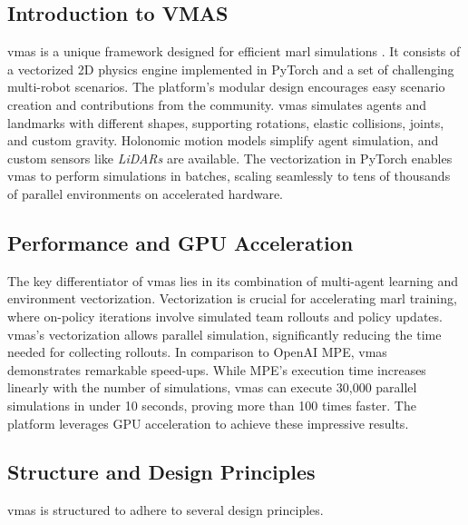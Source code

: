 \documentclass[12pt,a4paper,openright,twoside]{book}
\begin{document}
\subsection{Introduction to VMAS}

\ac{vmas} is a unique framework designed for efficient \ac{marl} simulations \cite{bettini2022vmas}. It consists of a vectorized 2D physics engine implemented in PyTorch and a set of challenging multi-robot scenarios. The platform's modular design encourages easy scenario creation and contributions from the community. \ac{vmas} simulates agents and landmarks with different shapes, supporting rotations, elastic collisions, joints, and custom gravity. Holonomic motion models simplify agent simulation, and custom sensors like \emph{LiDARs} are available. The vectorization in PyTorch enables \ac{vmas} to perform simulations in batches, scaling seamlessly to tens of thousands of parallel environments on accelerated hardware.

\subsection{Performance and GPU Acceleration}

The key differentiator of \ac{vmas} lies in its combination of multi-agent learning and environment vectorization. Vectorization is crucial for accelerating \ac{marl} training, where on-policy iterations involve simulated team rollouts and policy updates. \ac{vmas}'s vectorization allows parallel simulation, significantly reducing the time needed for collecting rollouts. In comparison to OpenAI MPE, \ac{vmas} demonstrates remarkable speed-ups. While MPE's execution time increases linearly with the number of simulations, \ac{vmas} can execute 30,000 parallel simulations in under 10 seconds, proving more than 100 times faster. The platform leverages GPU acceleration to achieve these impressive results.

\subsection{Structure and Design Principles}

\ac{vmas} is structured to adhere to several design principles.
\end{document}
